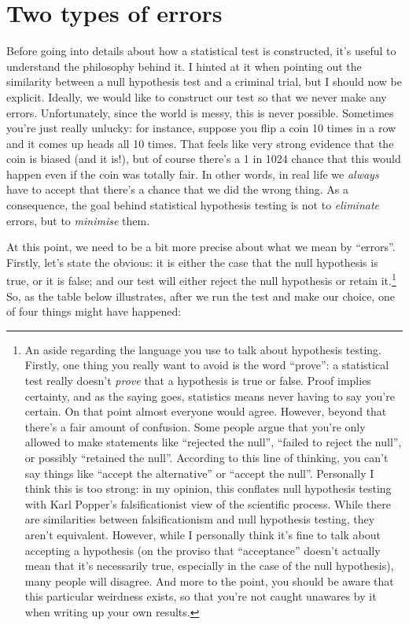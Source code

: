 \documentclass[
]{book}
\begin{document}
\hypertarget{errortypes}{%
\section{Two types of errors}\label{errortypes}}

Before going into details about how a statistical test is constructed, it's useful to understand the philosophy behind it. I hinted at it when pointing out the similarity between a null hypothesis test and a criminal trial, but I should now be explicit. Ideally, we would like to construct our test so that we never make any errors. Unfortunately, since the world is messy, this is never possible. Sometimes you're just really unlucky: for instance, suppose you flip a coin 10 times in a row and it comes up heads all 10 times. That feels like very strong evidence that the coin is biased (and it is!), but of course there's a 1 in 1024 chance that this would happen even if the coin was totally fair. In other words, in real life we \emph{always} have to accept that there's a chance that we did the wrong thing. As a consequence, the goal behind statistical hypothesis testing is not to \emph{eliminate} errors, but to \emph{minimise} them.

At this point, we need to be a bit more precise about what we mean by ``errors''. Firstly, let's state the obvious: it is either the case that the null hypothesis is true, or it is false; and our test will either reject the null hypothesis or retain it.\footnote{An aside regarding the language you use to talk about hypothesis testing. Firstly, one thing you really want to avoid is the word ``prove'': a statistical test really doesn't \emph{prove} that a hypothesis is true or false. Proof implies certainty, and as the saying goes, statistics means never having to say you're certain. On that point almost everyone would agree. However, beyond that there's a fair amount of confusion. Some people argue that you're only allowed to make statements like ``rejected the null'', ``failed to reject the null'', or possibly ``retained the null''. According to this line of thinking, you can't say things like ``accept the alternative'' or ``accept the null''. Personally I think this is too strong: in my opinion, this conflates null hypothesis testing with Karl Popper's falsificationist view of the scientific process. While there are similarities between falsificationism and null hypothesis testing, they aren't equivalent. However, while I personally think it's fine to talk about accepting a hypothesis (on the proviso that ``acceptance'' doesn't actually mean that it's necessarily true, especially in the case of the null hypothesis), many people will disagree. And more to the point, you should be aware that this particular weirdness exists, so that you're not caught unawares by it when writing up your own results.} So, as the table below illustrates, after we run the test and make our choice, one of four things might have happened:
\end{document}
